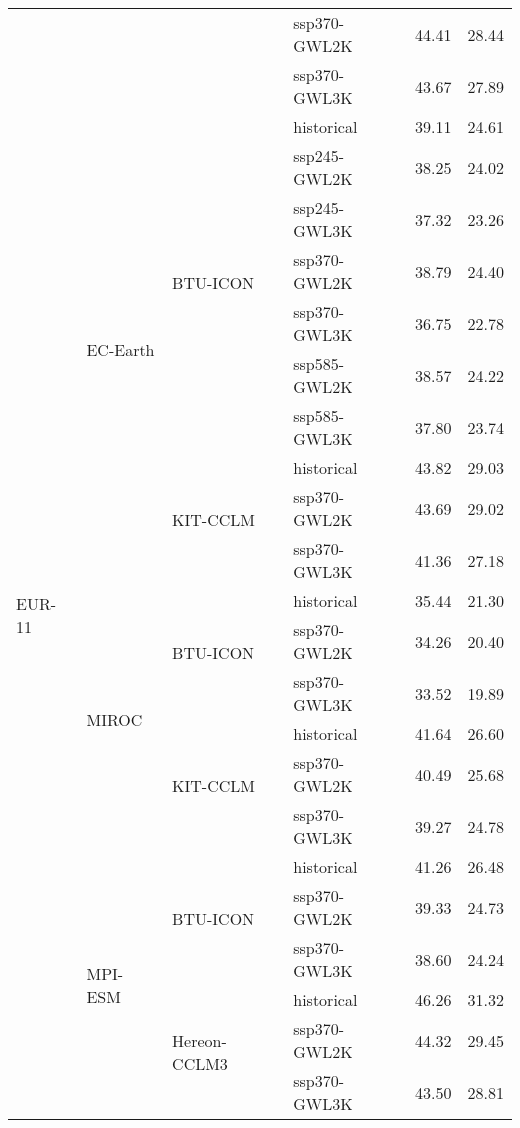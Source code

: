 \begin{table}[!htbp]
\begin{tabular}{lll|l|cc}
 &  &  & ssp370-GWL2K & 44.41 & 28.44 \\
 &  &  & ssp370-GWL3K & 43.67 & 27.89 \\
\midrule
\multirow{22}{*}{EUR-11} & \multirow{10}{*}{EC-Earth} & \multirow{7}{*}{BTU-ICON} & historical & 39.11 & 24.61 \\
 &  &  & ssp245-GWL2K & 38.25 & 24.02 \\
 &  &  & ssp245-GWL3K & 37.32 & 23.26 \\
 &  &  & ssp370-GWL2K & 38.79 & 24.40 \\
 &  &  & ssp370-GWL3K & 36.75 & 22.78 \\
 &  &  & ssp585-GWL2K & 38.57 & 24.22 \\
 &  &  & ssp585-GWL3K & 37.80 & 23.74 \\
\cmidrule(lr){3-6}
 &  & \multirow{3}{*}{KIT-CCLM} & historical & 43.82 & 29.03 \\
 &  &  & ssp370-GWL2K & 43.69 & 29.02 \\
 &  &  & ssp370-GWL3K & 41.36 & 27.18 \\
\cmidrule(lr){3-6}
\cmidrule(lr){2-6}
 & \multirow{6}{*}{MIROC} & \multirow{3}{*}{BTU-ICON} & historical & 35.44 & 21.30 \\
 &  &  & ssp370-GWL2K & 34.26 & 20.40 \\
 &  &  & ssp370-GWL3K & 33.52 & 19.89 \\
\cmidrule(lr){3-6}
 &  & \multirow{3}{*}{KIT-CCLM} & historical & 41.64 & 26.60 \\
 &  &  & ssp370-GWL2K & 40.49 & 25.68 \\
 &  &  & ssp370-GWL3K & 39.27 & 24.78 \\
\cmidrule(lr){3-6}
\cmidrule(lr){2-6}
 & \multirow{6}{*}{MPI-ESM} & \multirow{3}{*}{BTU-ICON} & historical & 41.26 & 26.48 \\
 &  &  & ssp370-GWL2K & 39.33 & 24.73 \\
 &  &  & ssp370-GWL3K & 38.60 & 24.24 \\
\cmidrule(lr){3-6}
 &  & \multirow{3}{*}{Hereon-CCLM3} & historical & 46.26 & 31.32 \\
 &  &  & ssp370-GWL2K & 44.32 & 29.45 \\
 &  &  & ssp370-GWL3K & 43.50 & 28.81 \\
\bottomrule
\end{tabular}
\end{table}
